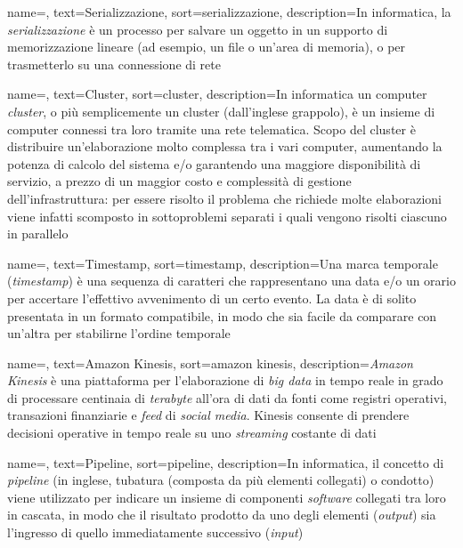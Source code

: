 {
    name=,
    text=Serializzazione,
    sort=serializzazione,
    description={In informatica, la \textit{serializzazione} è un processo per salvare un oggetto in un supporto di memorizzazione lineare (ad esempio, un file o un'area di memoria), o per trasmetterlo su una connessione di rete}
}

{
    name=,
    text=Cluster,
    sort=cluster,
    description={In informatica un computer \textit{cluster}, o più semplicemente un cluster (dall'inglese grappolo), è un insieme di computer connessi tra loro tramite una rete telematica. Scopo del cluster è distribuire un'elaborazione molto complessa tra i vari computer, aumentando la potenza di calcolo del sistema e/o garantendo una maggiore disponibilità di servizio, a prezzo di un maggior costo e complessità di gestione dell'infrastruttura: per essere risolto il problema che richiede molte elaborazioni viene infatti scomposto in sottoproblemi separati i quali vengono risolti ciascuno in parallelo}
}

{
    name=,
    text=Timestamp,
    sort=timestamp,
    description={Una marca temporale (\textit{timestamp}) è una sequenza di caratteri che rappresentano una data e/o un orario per accertare l'effettivo avvenimento di un certo evento. La data è di solito presentata in un formato compatibile, in modo che sia facile da comparare con un'altra per stabilirne l'ordine temporale}
}

{
    name=,
    text=Amazon Kinesis,
    sort=amazon kinesis,
    description={\textit{Amazon Kinesis} è una piattaforma per l'elaborazione di \textit{big data} in tempo reale in grado di processare centinaia di \textit{terabyte} all'ora di dati da fonti come registri operativi, transazioni finanziarie e \textit{feed} di \textit{social media}. Kinesis consente di prendere decisioni operative in tempo reale su uno \textit{streaming} costante di dati}
}

{
    name=,
    text=Pipeline,
    sort=pipeline,
    description={In informatica, il concetto di \textit{pipeline} (in inglese, tubatura (composta da più elementi collegati) o condotto) viene utilizzato per indicare un insieme di componenti \textit{software} collegati tra loro in cascata, in modo che il risultato prodotto da uno degli elementi (\textit{output}) sia l'ingresso di quello immediatamente successivo (\textit{input})}
}

